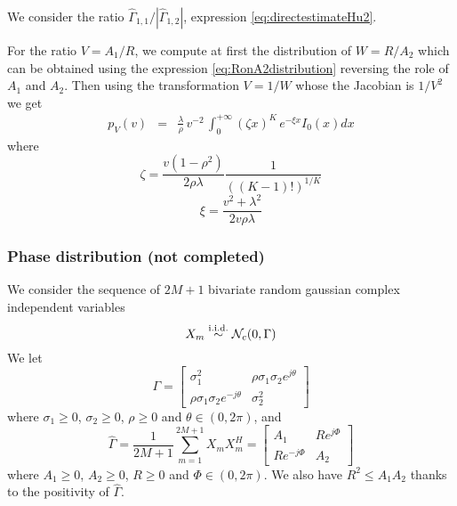 We consider the ratio $\hat \Gamma_{1,1}/|\hat \Gamma_{1,2}|$, expression \eqref{eq:directestimateHu2}.

For the ratio $V=A_{1}/R$, we compute at first the distribution of $W=R/A_{2}$ which can be obtained using the expression \eqref{eq:RonA2distribution} reversing the role of $A_{1}$ and $A_{2}$. Then using the transformation $V=1/W$ whose the Jacobian is $1/V^{2}$ we get
\begin{eqnarray}
 \label{eq:A1onRdistribution}
p_{V}(v)
 &=&  \frac{\lambda}{\rho}\,v^{-2}\,
 \int_{0}^{+\infty}(\zeta x)^{K} \,e^{-\xi x}I_{0}(x)dx
\end{eqnarray}
where
$$
 \zeta = \frac{v(1-\rho^{2})}{2\rho\lambda}\frac{1}{((K-1)!)^{1/K}}
$$
$$
 \xi = \frac{v^{2}+\lambda^{2}}{2v\rho\lambda}
$$


\subsubsection{Phase distribution (not completed)}

We consider the sequence of $2M+1$ bivariate random gaussian complex independent variables
$$
 X_{m}\stackrel{\mathrm{i.i.d.}}{\sim}\mathcal{N}_{c}(0,\Gamma)
$$
We let
$$
 \Gamma =
 \begin{bmatrix}
 \sigma_{1}^{2}&\rho \sigma_{1}\sigma_{2}e^{j\theta}
 \\
 \rho \sigma_{1}\sigma_{2}e^{-j\theta}&\sigma_{2}^{2}
 \end{bmatrix}
$$
where $\sigma_{1}\geq 0$, $\sigma_{2}\geq 0$, $\rho\geq 0$ and $\theta\in(0,2\pi)$, 
and
$$
 \hat\Gamma=\frac{1}{2M+1}\sum_{m=1}^{2M+1}X_{m}X_{m}^{H}=\begin{bmatrix}
 A_{1}%
 &
 R e^{j\Phi}%
 \\
 R e^{-j\Phi}%
 &
 A_{2}%
 \end{bmatrix}
$$
where $A_{1}\geq 0$, $A_{2}\geq 0$, $R\geq 0$ and $\Phi\in(0,2\pi)$. We also have $R^{2}\leq A_{1}A_{2}$ thanks to the positivity of $\hat\Gamma$.


